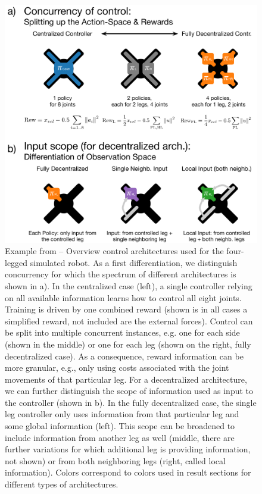 \begin{figure}[tb]
\centering
\includegraphics[width=0.5\columnwidth]{img/4-Legs Architectures.pdf}%
\caption{Example from \citep{schilling2021} -- Overview control architectures used for the four-legged simulated robot. As a first differentiation, we distinguish concurrency for which the spectrum of different architectures is shown in a). In the centralized case (left), a single controller relying on all available information learns how to control all eight joints. Training is driven by one combined reward (shown is in all cases a simplified reward, not included are the external forces). Control can be split into multiple concurrent instances, e.g. one for each side (shown in the middle) or one for each leg (shown on the right, fully decentralized case). As a consequence, reward information can be more granular, e.g., only using costs associated with the joint movements of that particular leg. For a decentralized architecture, we can further distinguish the scope of information used as input to the controller (shown in b). In the fully decentralized case, the single leg controller only uses information from that particular leg and some global information (left). This scope can be broadened to include information from another leg as well (middle, there are further variations for which additional leg is providing information, not shown) or from both neighboring legs (right, called local information). Colors correspond to colors used in result sections for different types of architectures.}
\label{fig_control_arch}
\end{figure}

